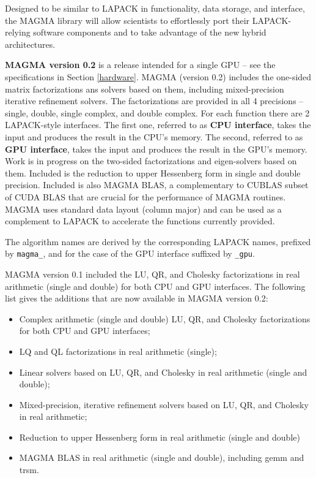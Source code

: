 \documentclass[10pt]{book}
\begin{document}
\vspace{0.1in}
Designed to be similar to LAPACK in functionality, data
storage, and interface, the MAGMA library will allow scientists to effortlessly
port their LAPACK-relying software components and to take advantage of the
new hybrid architectures.

\vspace{0.1in}
{\bf MAGMA version 0.2} is a release intended for a single GPU
 -- see the specifications in Section \ref{hardware}.
MAGMA (version 0.2) includes the one-sided matrix factorizations
ans solvers based on them, including mixed-precision iterative refinement
solvers. The factorizations are provided in all 4 precisions -- single,
double, single complex, and double complex. For each function there
are 2 LAPACK-style interfaces. The first one, referred to as 
{\bf CPU interface}, takes the input and produces the result in the 
CPU's memory. The second, referred to as {\bf GPU interface}, takes the 
input and produces the result in the GPU's memory. Work is in progress
on the two-sided factorizations and eigen-solvers based on them.
Included is the reduction to upper Hessenberg form in single and double
precision. Included is also MAGMA BLAS, a complementary to CUBLAS subset 
of CUDA BLAS that are crucial for the performance of MAGMA routines.
MAGMA uses standard data layout (column major) and can be used as a 
complement to LAPACK to accelerate the functions currently provided.

\vspace{0.1in}
The algorithm names are derived by the corresponding LAPACK names,
prefixed by {\tt magma\_}, and for the case of the GPU interface
suffixed by {\tt \_gpu}.

\vspace{0.1in}
MAGMA version 0.1 included the LU, QR, and Cholesky factorizations
in real arithmetic (single and double) for both CPU and GPU interfaces.  
The following list gives the additions that are now
available in MAGMA version 0.2:
\begin{itemize}
\item Complex arithmetic (single and double) LU, QR, and Cholesky
      factorizations for both CPU and GPU interfaces; 
\item LQ and QL factorizations in real arithmetic (single);       
\item Linear solvers based on LU, QR, and Cholesky in
      real arithmetic (single and double); 
\item Mixed-precision, iterative refinement solvers based
      on LU, QR, and Cholesky in real arithmetic;
\item Reduction to upper Hessenberg form in real arithmetic
      (single and double)
\item MAGMA BLAS in real arithmetic (single and double), including 
      gemm and trsm.
\end{itemize}
\end{document}
